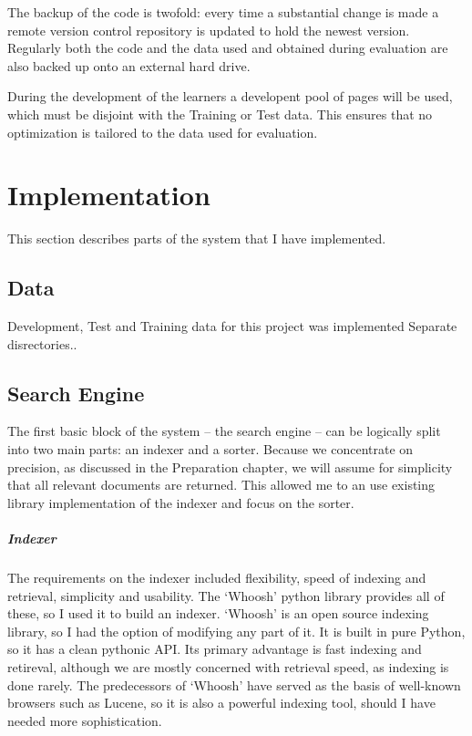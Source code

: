 \documentclass[12pt,twoside,notitlepage]{report}
\begin{document}
The backup of the code is twofold: every time a substantial change is made a remote
version control repository is updated to hold the newest version. Regularly both the code and
the data used and obtained during evaluation are also backed up onto an
external hard drive. 

During the development of the learners a developent pool of pages will
be used, which must be disjoint with the Training or Test data. This ensures
that no optimization is tailored to the data used for evaluation. 
\cleardoublepage
\chapter{Implementation}
This section describes parts of the system that I have implemented.

\section{Data}
Development, Test and Training data for this project was implemented
Separate disrectories..

\section{Search Engine}

The first basic block of the system -- the search engine -- can be logically
split into two main parts: an indexer and a sorter. Because we concentrate on
precision, as discussed in the Preparation chapter, we will assume for
simplicity that all relevant documents are returned. This allowed me to an use
existing library implementation of the indexer and focus on the sorter.

\paragraph{Indexer}

The requirements on the indexer included flexibility, speed of indexing and
retrieval, simplicity and usability.  The `Whoosh' python library provides all
of these, so I used it to build an indexer. `Whoosh' is an open source indexing
library, so I had the option of modifying any part of it. It is  built in pure
Python, so it has a clean pythonic API. Its primary advantage is fast indexing
and retireval, although we are mostly concerned with retrieval speed, as
indexing is done rarely. The predecessors of `Whoosh' have served as the basis
of well-known browsers such as Lucene, so it is also a powerful indexing tool,
should I have needed more sophistication.
\end{document}
